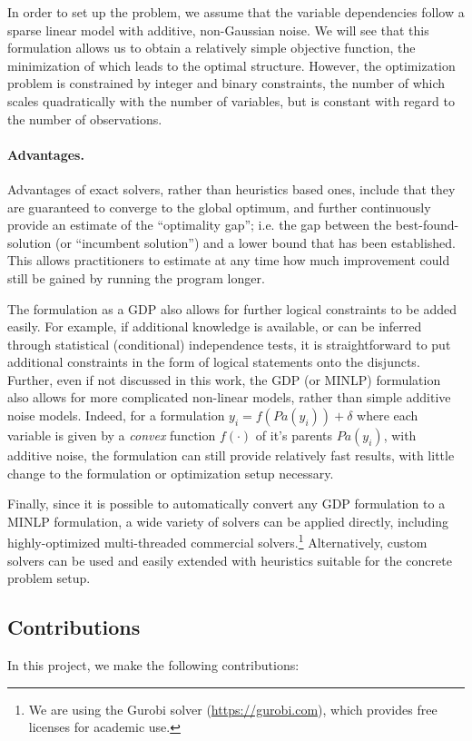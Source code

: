\documentclass[11pt]{article}
\begin{document}
In order to set up the problem, we assume that the variable dependencies follow a sparse linear model with additive, non-Gaussian noise.
We will see that this formulation allows us to obtain a relatively simple objective function, the minimization of which leads to the optimal structure.
However, the optimization problem is constrained by integer and binary constraints, the number of which scales quadratically with the number of variables, but is constant with regard to the number of observations.

\paragraph{Advantages.}
\label{sec:orge1f00fe}
Advantages of exact solvers, rather than heuristics based ones, include that they are guaranteed to converge to the global optimum, and further continuously provide an estimate of the ``optimality gap''; i.e. the gap between the best-found-solution (or ``incumbent solution'') and a lower bound that has been established.
This allows practitioners to estimate at any time how much improvement could still be gained by running the program longer.

The formulation as a GDP also allows for further logical constraints to be added easily.
For example, if additional knowledge is available, or can be inferred through statistical (conditional) independence tests, it is straightforward to put additional constraints in the form of logical statements onto the disjuncts.
Further, even if not discussed in this work, the GDP (or MINLP) formulation also allows for more complicated non-linear models, rather than simple additive noise models.
Indeed, for a formulation \(y_i = f({Pa}(y_i)) + \delta\) where each variable is given by a \emph{convex} function \(f(\cdot)\) of it's parents \({Pa}(y_i)\), with additive noise, the formulation can still provide relatively fast results, with little change to the formulation or optimization setup necessary.

Finally, since it is possible to automatically convert any GDP formulation to a MINLP formulation, a wide variety of solvers can be applied directly, including highly-optimized multi-threaded commercial solvers.\footnote{We are using the Gurobi solver (\url{https://gurobi.com}), which provides free licenses for academic use.}
Alternatively, custom solvers can be used and easily extended with heuristics suitable for the concrete problem setup.
\subsection{Contributions}
\label{sec:org24e800e}
In this project, we make the following contributions:
\end{document}
